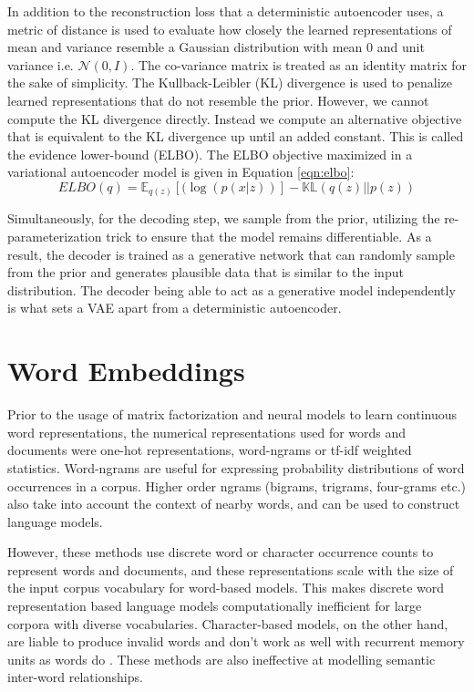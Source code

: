 In addition to the reconstruction loss that a deterministic autoencoder uses, a metric of distance is used to evaluate how closely the learned representations of mean and variance resemble a Gaussian distribution with mean 0 and unit variance i.e. $\mathcal{N}(0,I)$. The co-variance matrix is treated as an identity matrix for the sake of simplicity. The Kullback-Leibler (KL) divergence \citep{kullback1951information} is used to penalize learned representations that do not resemble the prior. However, we cannot compute the KL divergence directly. Instead we compute an alternative objective that is equivalent to the KL divergence up until an added constant. This is called the evidence lower-bound (ELBO). The ELBO objective maximized in a variational autoencoder model is given in Equation \ref{eqn:elbo}:
\begin{equation} \label{eqn:elbo}
	ELBO(q) = \mathbb{E}_{q(z)} [(\log(p(x|z))] - \mathbb{KL}(q(z)||p(z))
\end{equation}

Simultaneously, for the decoding step, we sample from the prior, utilizing the re-parameterization trick to ensure that the model remains differentiable. As a result, the decoder is trained as a generative network that can randomly sample from the prior and generates plausible data that is similar to the input distribution. The decoder being able to act as a generative model independently is what sets a VAE apart from a deterministic autoencoder.


\section{Word Embeddings}

Prior to the usage of matrix factorization and neural models to learn continuous word representations, the numerical representations used for words and documents were one-hot representations, word-ngrams \citep{brown1992class} or tf-idf weighted statistics. Word-ngrams are useful for expressing probability distributions of word occurrences in a corpus. Higher order ngrams (bigrams, trigrams, four-grams etc.) also take into account the context of nearby words, and can be used to construct language models.

However, these methods use discrete word or character occurrence counts to represent words and documents, and these representations scale with the size of the input corpus vocabulary for word-based models. This makes discrete word representation based language models computationally inefficient for large corpora with diverse vocabularies. Character-based models, on the other hand, are liable to produce invalid words and don't work as well with recurrent memory units as words do \citep{bojanowski2015alternative}. These methods are also ineffective at modelling semantic inter-word relationships.

